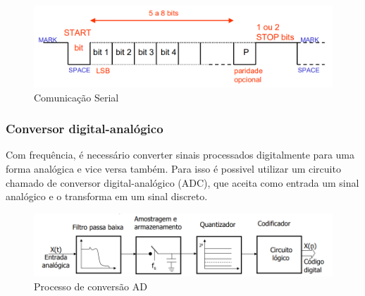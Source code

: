 \begin{figure}[!htbp]
    \caption{Comunicação Serial} \label{proto_start_stop}
    \includegraphics[scale=0.5]{images/proto_start_stop.png}
\end{figure}

\subsubsection{Conversor digital-analógico}

Com frequência, é necessário converter sinais processados digitalmente para uma forma analógica e vice versa também. Para isso é possivel utilizar um circuito chamado de conversor digital-analógico (ADC), que aceita como entrada um sinal analógico e o transforma em um sinal discreto.

\begin{figure}[!htbp]
    \caption{Processo de conversão AD} \label{ad_da}
    \includegraphics[scale=0.5]{images/AD-DA_adaptado.png}
\end{figure}

